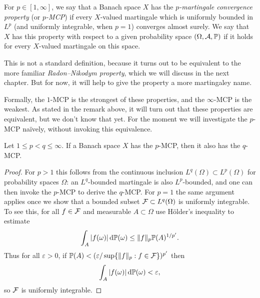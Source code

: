 \begin{defn}
  For $p \in [1,\infty]$, we say that a Banach space $X$ has the \emph{$p$-martingale convergence property} (or \emph{$p$-MCP}) if every $X$-valued martingale which is uniformly bounded in $L^p$ (and uniformly integrable, when $p=1$) converges almost surely.
  We say that $X$ has this property with respect to a given probability space $(\Omega,\mathcal{A},\mathbb{P})$ if it holds for every $X$-valued martingale on this space.
\end{defn}

\begin{rmk}
  This is not a standard definition, because it turns out to be equivalent to the more familiar \emph{Radon--Nikodym property}, which we will discuss in the next chapter. But for now, it will help to give the property a more martingaley name.
\end{rmk}

Formally, the $1$-MCP is the strongest of these properties, and the $\infty$-MCP is the weakest.
As stated in the remark above, it will turn out that these properties are equivalent, but we don't know that yet.
For the moment we will investigate the $p$-MCP na\"ively, without invoking this equivalence.

\begin{prop}
  Let $1 \leq p < q \leq \infty$.
  If a Banach space $X$ has the $p$-MCP, then it also has the $q$-MCP.
\end{prop}

\begin{proof}
  For $p > 1$ this follows from the continuous inclusion $L^q(\Omega) \subset L^p(\Omega)$ for probability spaces $\Omega$: an $L^q$-bounded martingale is also $L^p$-bounded, and one can then invoke the $p$-MCP to derive the $q$-MCP.
  For $p = 1$ the same argument applies once we show that a bounded subset $\mathcal{F} \subset L^q(\Omega)$ is uniformly integrable.
  To see this, for all $f \in \mathcal{F}$ and measurable $A \subset \Omega$ use H\"older's inequality to estimate
  \begin{equation*}
    \int_{A} |f(\omega)| \, \mathrm{d}\mathbb{P}(\omega) \leq \|f\|_{p} \mathbb{P}(A)^{1/p'}.
  \end{equation*}
  Thus for all $\varepsilon > 0$, if $\mathbb{P}(A) < (\varepsilon/\sup\{\|f\|_p : f \in \mathcal{F}\})^{p'}$ then
  \begin{equation*}
    \int_{A} |f(\omega)| \, \mathrm{d}\mathbb{P}(\omega) < \varepsilon,
  \end{equation*}
  so $\mathcal{F}$ is uniformly integrable.
  
\end{proof}


